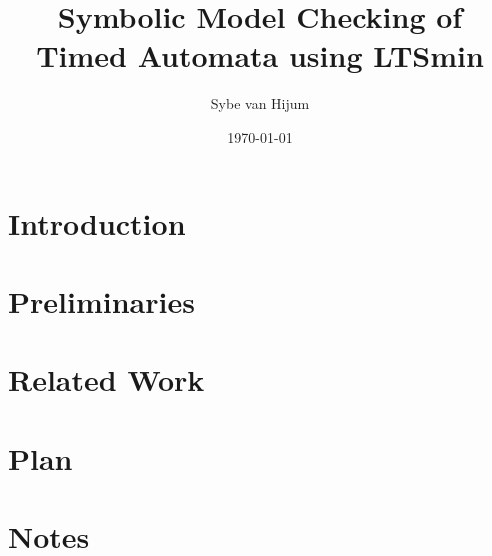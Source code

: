\documentclass[11pt,a4paper]{article}
\newcommand{\ltsmin}{LTSmin}
\begin{document}
\newtheorem{mydef}{Definition}
\title{Symbolic Model Checking of Timed Automata using \ltsmin{}}
\author{Sybe van Hijum}
\date{\today{}}
\maketitle

\clearpage
\tableofcontents

\clearpage
\section{Introduction}


%

\clearpage
\section{Preliminaries}


\clearpage
\section{Related Work}


\clearpage
\section{Plan}


\clearpage
\section{Notes}


%

%

\clearpage
{}

\end{document}

